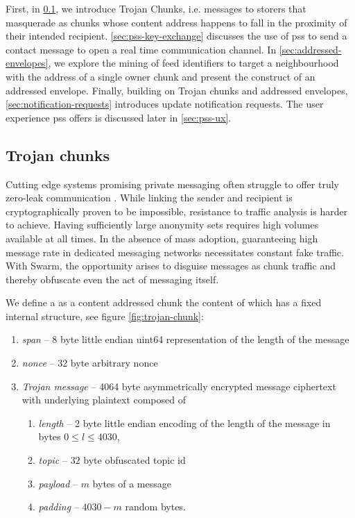 First, in \ref{sec:trojan}, we introduce Trojan Chunks, i.e. messages to storers that masquerade as chunks whose content address happens to fall in the proximity of their intended recipient. 
\ref{sec:pss-key-exchange} discusses the use of pss to send a contact message to open a real time communication channel.
In \ref{sec:addressed-envelopes}, we explore the mining of feed identifiers to target a neighbourhood with the address of a single owner chunk and present the construct of an addressed envelope. Finally, building on Trojan chunks and addressed envelopes, \ref{sec:notification-requests} introduces update notification requests.
The user experience pss offers is discussed later in \ref{sec:pss-ux}. 

\subsection{Trojan chunks\statusgreen}\label{sec:trojan}

Cutting edge systems promising private messaging often struggle to offer truly zero-leak communication \cite{kwon2016riffle}. While linking the sender and recipient is cryptographically proven to be impossible, resistance to traffic analysis is harder to achieve. Having sufficiently large anonymity sets requires high volumes available at all times. In the absence of mass adoption, guaranteeing high message rate in dedicated messaging networks necessitates constant fake traffic. With Swarm, the opportunity arises to disguise messages as chunk traffic and thereby obfuscate even the act of messaging itself. 

We define a  as a content addressed chunk the content of which has a fixed internal structure, see figure \ref{fig:trojan-chunk}:

\begin{enumerate}
    \item \emph{span} -- 8 byte little endian uint64 representation of the length of the message  
    \item \emph{nonce} -- 32 byte arbitrary nonce 
    \item \emph{Trojan message} -- 4064 byte asymmetrically encrypted message ciphertext with underlying plaintext composed of
    \begin{enumerate}
        \item \emph{length} -- 2 byte little endian encoding of the length of the message in bytes $0\leq l\leq 4030$,
        \item \emph{topic} -- $32$ byte obfuscated topic id   
        \item \emph{payload} -- $m$ bytes of a message 
        \item \emph{padding} -- $4030-m$ random bytes.
    \end{enumerate}
\end{enumerate}

